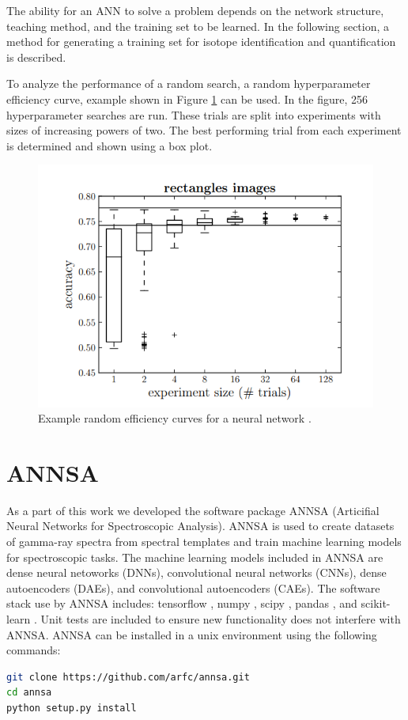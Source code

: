 The ability for an ANN to solve a problem depends on the network structure, teaching method, and the training set to be learned. In the following section, a method for generating a training set for isotope identification and quantification is described.

To analyze the performance of a random search, a random hyperparameter efficiency curve, example shown in Figure \ref{fig:Bergstra_random_efficiency_curve_DNN} can be used. In the figure, 256 hyperparameter searches are run. These trials are split into experiments with sizes of increasing powers of two. The best performing trial from each experiment is determined and shown using a box plot.


\begin{figure}[H]
	\centering
	\includegraphics[width=0.9\linewidth]{model_choice_hyperparameter_search_images/Bergstra12_random_efficiency_curve}
	\caption{Example random efficiency curves for a neural network \cite{Bergstra2012}.}
	\label{fig:Bergstra_random_efficiency_curve_DNN}
\end{figure}

\section{ANNSA}

As a part of this work we developed the software package ANNSA (Articifial Neural Networks for Spectroscopic Analysis). ANNSA is used to create datasets of gamma-ray spectra from spectral templates and train machine learning models for spectroscopic tasks. The machine learning models included in ANNSA are dense neural netoworks (DNNs), convolutional neural networks (CNNs), dense autoencoders (DAEs), and convolutional autoencoders (CAEs). The software stack use by ANNSA includes: tensorflow \cite{tensorflow2015-whitepaper}, numpy \cite{numpy}, scipy \cite{scipy}, pandas \cite{mckinney-proc-scipy-2010}, and scikit-learn \cite{scikit-learn}. Unit tests are included to ensure new functionality does not interfere with ANNSA. ANNSA can be installed in a unix environment using the following commands:
\begin{lstlisting}[language=bash, basicstyle={\small\ttfamily}]
git clone https://github.com/arfc/annsa.git
cd annsa
python setup.py install
\end{lstlisting}

